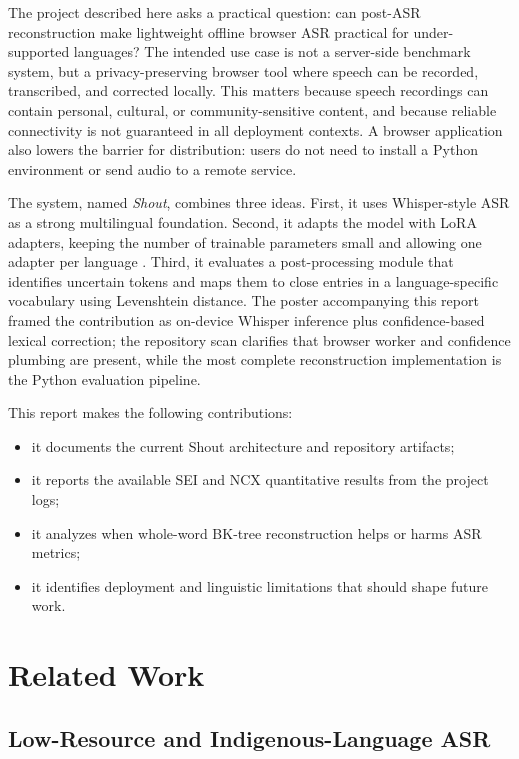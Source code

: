 \documentclass[11pt]{article}
\begin{document}
The project described here asks a practical question: can post-ASR reconstruction make lightweight offline browser ASR practical for under-supported languages? The intended use case is not a server-side benchmark system, but a privacy-preserving browser tool where speech can be recorded, transcribed, and corrected locally. This matters because speech recordings can contain personal, cultural, or community-sensitive content, and because reliable connectivity is not guaranteed in all deployment contexts. A browser application also lowers the barrier for distribution: users do not need to install a Python environment or send audio to a remote service.

The system, named \textit{Shout}, combines three ideas. First, it uses Whisper-style ASR as a strong multilingual foundation. Second, it adapts the model with LoRA adapters, keeping the number of trainable parameters small and allowing one adapter per language \citep{hu2021lora,song2024lorawhisper}. Third, it evaluates a post-processing module that identifies uncertain tokens and maps them to close entries in a language-specific vocabulary using Levenshtein distance. The poster accompanying this report framed the contribution as on-device Whisper inference plus confidence-based lexical correction; the repository scan clarifies that browser worker and confidence plumbing are present, while the most complete reconstruction implementation is the Python evaluation pipeline.

This report makes the following contributions:

\begin{itemize}
    \item it documents the current Shout architecture and repository artifacts;
    \item it reports the available SEI and NCX quantitative results from the project logs;
    \item it analyzes when whole-word BK-tree reconstruction helps or harms ASR metrics;
    \item it identifies deployment and linguistic limitations that should shape future work.
\end{itemize}

\section{Related Work}

\subsection{Low-Resource and Indigenous-Language ASR}
\end{document}
